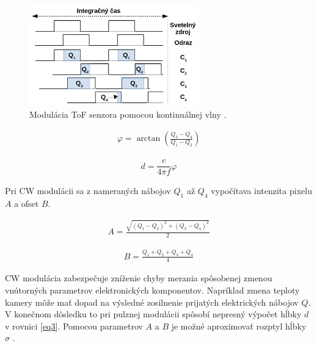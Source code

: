 \begin{figure}[H]
	\centering
	\includegraphics[width=0.65\textwidth]{figures/tof_principle_a.png} 
	\caption{Modulácia ToF senzora pomocou kontinuálnej vlny \cite{li2014time}.}
	\label{fig:tof_principle_b}
\end{figure}

\begin{equation}
\label{eq4}
\begin{aligned}
\varphi=\arctan \left( \frac{Q_3 - Q_4}{Q_1-Q_2} \right) 
\end{aligned}
\end{equation}

\begin{equation}
\label{eq:cw:depth}
\begin{aligned}
d=\dfrac{c}{4\pi f}\varphi 
\end{aligned}
\end{equation}

Pri CW modulácii sa z nameraných nábojov $Q_1$ až $Q_4$ vypočítava intenzita pixelu $A$ a ofset $B$. 

\begin{equation}
\label{eq5}
\begin{aligned}
A=\frac{\sqrt{\left(Q_1 - Q_2\right)^2 + \left(Q_3 - Q_4\right)^2 }} {2} 
\end{aligned}
\end{equation}

\begin{equation}
\label{eq6}
\begin{aligned}
B=\frac{Q_1 + Q_2 +Q_3 + Q_4}{4} 
\end{aligned}
\end{equation}

CW modulácia zabezpečuje zníženie chyby merania spôsobenej zmenou vnútorných parametrov elektronických komponentov. Napríklad zmena teploty kamery môže mať dopad na výsledné zosilnenie prijatých elektrických nábojov $Q$. V konečnom dôsledku to pri pulznej modulácii spôsobí nepresný výpočet hĺbky $d$ v rovnici \ref{eq3}. Pomocou parametrov $A$ a $B$ je možné aproximovať rozptyl hĺbky $\sigma$ \cite{li2014time}.

